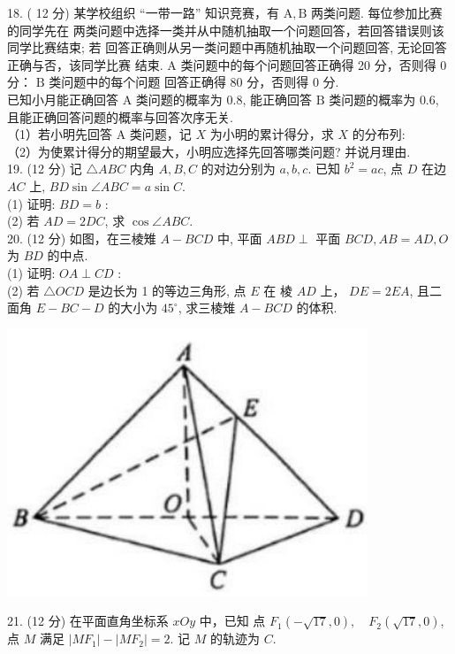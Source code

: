 \documentclass[UTF8]{ctexart}
\begin{document}
	18. ( 12 分)
	某学校组织 “一带一路” 知识竞赛，有 $\mathrm{A}, \mathrm{B}$ 两类问题. 每位参加比赛的同学先在
	两类问题中选择一类并从中随机抽取一个问题回答，若回答错误则该同学比赛结束; 若
	回答正确则从另一类问题中再随机抽取一个问题回答, 无论回答正确与否，该同学比赛
	结束. $\mathrm{A}$ 类问题中的每个问题回答正确得 20 分，否则得 0 分： $\mathrm{B}$ 类问题中的每个问题
	回答正确得 80 分，否则得 0 分.\\
	已知小月能正确回答 $\mathrm{A}$ 类问题的概率为 $0.8$, 能正确回答 $\mathrm{B}$ 类问题的概率为 $0.6$,
	且能正确回答问题的概率与回答次序无关.\\
	（1）若小明先回答 $\mathrm{A}$ 类问题，记 $X$ 为小明的累计得分，求 $X$ 的分布列:\\
	（2）为使累计得分的期望最大，小明应选择先回答哪类问题? 并说月理由.\\
	
	19. (12 分)
	记 $\triangle A B C$ 内角 $A, B, C$ 的对边分别为 $a, b, c .$ 已知 $b^{2}=a c$, 点 $D$ 在边 $A C$
	上, $B D \sin \angle A B C=a \sin C$.\\
	
	(1) 证明: $B D=b$ :\\
	
	(2) 若 $A D=2 D C$, 求 $\cos \angle A B C$.\\
	
	20. (12 分)
	如图，在三棱雉 $A-B C D$ 中, 平面 $A B D \perp$ 平面
	$B C D, A B=A D, O$ 为 $B D$ 的中点.\\
	
	(1) 证明: $O A \perp C D$ :\\
	
	(2) 若 $\triangle O C D$ 是边长为 1 的等边三角形, 点 $E$ 在
	棱 $A D$ 上， $D E=2 E A$, 且二面角 $E-B C-D$ 的大小为
	$45^{\circ}$, 求三棱雉 $A-B C D$ 的体积.\\
	
\begin{center}
	\includegraphics[width=0.35\linewidth]{a/T20}
\end{center}

	\newpage
	
	21. (12 分)
	在平面直角坐标系 $x O y$ 中，已知 点 $F_{1}(-\sqrt{17}, 0), \quad F_{2}(\sqrt{17}, 0)$, 点 $M$ 满足
	$\left|M F_{1}\right|-\left|M F_{2}\right|=2$. 记 $M$ 的轨迹为 $C$.\\
	
\end{document}
